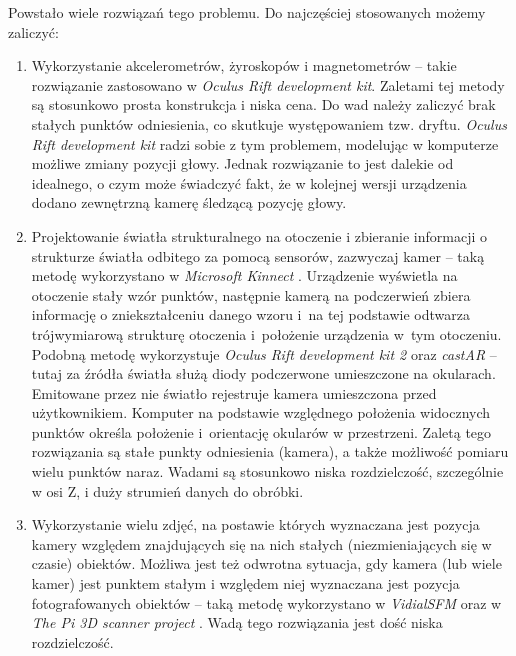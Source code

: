 Powstało wiele rozwiązań tego problemu. Do najczęściej stosowanych możemy zaliczyć:
\begin{enumerate}
 \item 
 Wykorzystanie akcelerometrów, żyroskopów i magnetometrów -- 
takie rozwiązanie zastosowano w \textit{Oculus Rift development kit}. Zaletami tej metody są stosunkowo
prosta konstrukcja i niska cena.
Do wad należy zaliczyć brak stałych punktów odniesienia, co skutkuje występowaniem tzw. dryftu.
\textit{Oculus Rift development kit} radzi sobie z tym problemem, modelując w komputerze możliwe zmiany pozycji głowy.
Jednak rozwiązanie to jest dalekie od idealnego, o czym może świadczyć fakt, że w kolejnej wersji 
urządzenia dodano zewnętrzną kamerę śledzącą pozycję głowy.

\item \label{itm:second_method}
 Projektowanie światła strukturalnego na otoczenie i zbieranie informacji o strukturze 
 światła odbitego za pomocą sensorów, zazwyczaj kamer -- 
 taką metodę wykorzystano w \textit{Microsoft Kinnect} \cite{bib:MicrosoftKinect}.
 Urządzenie wyświetla na otoczenie stały wzór punktów, następnie kamerą na podczerwień
 zbiera informację o zniekształceniu danego wzoru i~na tej podstawie odtwarza  
 trójwymiarową strukturę otoczenia i~położenie urządzenia w~tym otoczeniu.
 Podobną metodę wykorzystuje \textit{Oculus Rift development kit 2} \cite{bib:OculusRiftDK2} oraz 
 \textit{castAR} \cite{bib:castAR} -- tutaj za źródła światła służą diody podczerwone umieszczone na okularach.
 Emitowane przez nie światło rejestruje kamera umieszczona przed użytkownikiem.
 Komputer na podstawie względnego położenia widocznych punktów określa położenie i~orientację
 okularów w przestrzeni.
 Zaletą tego rozwiązania są stałe punkty odniesienia (kamera), a także możliwość pomiaru wielu punktów naraz.
 Wadami są stosunkowo niska rozdzielczość, szczególnie w osi Z, i duży strumień danych do obróbki.

\item
 Wykorzystanie wielu zdjęć, na postawie których 
 wyznaczana jest pozycja kamery względem znajdujących się na nich  stałych (niezmieniających się w czasie) obiektów. 
 Możliwa jest też odwrotna sytuacja, gdy  
  kamera (lub wiele kamer) jest punktem stałym i względem niej wyznaczana jest pozycja fotografowanych obiektów --   
 taką metodę wykorzystano w \textit{VidialSFM} \cite{bib:VisualSFM} oraz w \textit{The Pi 3D scanner project} \cite{bib:pi3dscan}. 
 Wadą tego rozwiązania jest dość niska rozdzielczość.
 

\end{enumerate}
